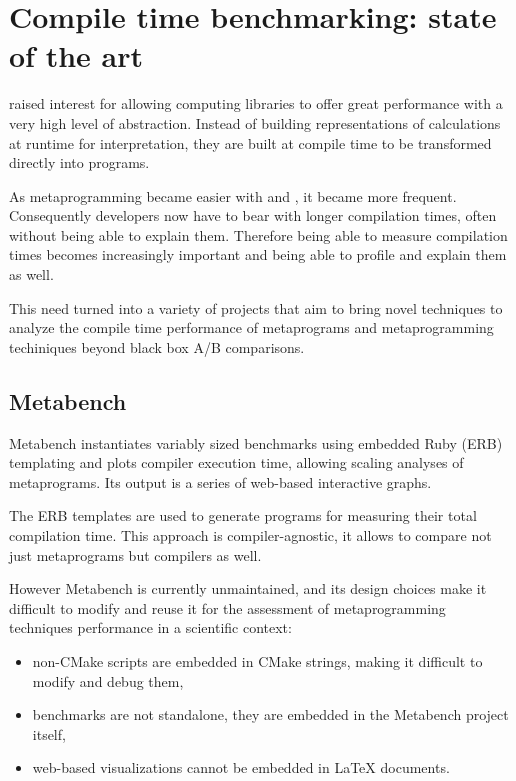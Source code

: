 \documentclass[../main]{subfiles}
\begin{document}
\section{
  Compile time benchmarking: state of the art
}

\cpp \tmp raised interest for allowing computing libraries
to offer great performance with a very high level of abstraction.
Instead of building representations of calculations at runtime for
interpretation, they are built at compile time to be transformed directly into
programs.

As metaprogramming became easier with  and ,
it became more frequent. Consequently developers now have to bear with longer
compilation times, often without being able to explain them.
Therefore being able to measure compilation times becomes increasingly important
and being able to profile and explain them as well.

This need turned into a variety of projects that aim to bring novel techniques
to analyze the compile time performance of \cpp metaprograms and metaprogramming
techiniques beyond black box A/B comparisons.

%

\subsection{
  Metabench
}

Metabench\cite{metabench} instantiates variably sized benchmarks using
embedded Ruby (ERB) templating and plots compiler execution time, allowing
scaling analyses of metaprograms. Its output is a series of web-based
interactive graphs.

The ERB templates are used to generate \cpp programs for measuring their
total compilation time. This approach is compiler-agnostic, it allows to compare
not just metaprograms but compilers as well.

However Metabench is currently unmaintained, and its design choices make it
difficult to modify and reuse it for the assessment of metaprogramming
techniques performance in a scientific context:

\begin{itemize}
\item
non-CMake scripts are embedded in CMake strings, making it difficult to modify
and debug them,

\item
benchmarks are not standalone, they are embedded in the Metabench
project itself,

\item
web-based visualizations cannot be embedded in \LaTeX{} documents.
\end{itemize}
\end{document}
